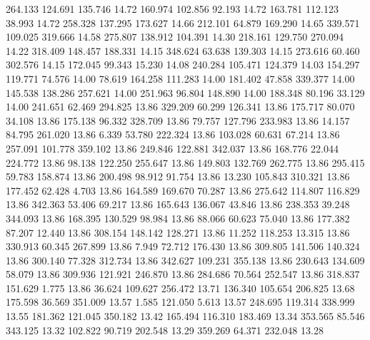  264.133  124.691  135.746        14.72
 160.974  102.856   92.193        14.72
 163.781  112.123   38.993        14.72
 258.328  137.295  173.627        14.66
 212.101   64.879  169.290        14.65
 339.571  109.025  319.666        14.58
 275.807  138.912  104.391        14.30
 218.161  129.750  270.094        14.22
 318.409  148.457  188.331        14.15
 348.624   63.638  139.303        14.15
 273.616   60.460  302.576        14.15
 172.045   99.343   15.230        14.08
 240.284  105.471  124.379        14.03
 154.297  119.771   74.576        14.00
  78.619  164.258  111.283        14.00
 181.402   47.858  339.377        14.00
 145.538  138.286  257.621        14.00
 251.963   96.804  148.890        14.00
 188.348   80.196   33.129        14.00
 241.651   62.469  294.825        13.86
 329.209   60.299  126.341        13.86
 175.717   80.070   34.108        13.86
 175.138   96.332  328.709        13.86
  79.757  127.796  233.983        13.86
  14.157   84.795  261.020        13.86
   6.339   53.780  222.324        13.86
 103.028   60.631   67.214        13.86
 257.091  101.778  359.102        13.86
 249.846  122.881  342.037        13.86
 168.776   22.044  224.772        13.86
  98.138  122.250  255.647        13.86
 149.803  132.769  262.775        13.86
 295.415   59.783  158.874        13.86
 200.498   98.912   91.754        13.86
  13.230  105.843  310.321        13.86
 177.452   62.428    4.703        13.86
 164.589  169.670   70.287        13.86
 275.642  114.807  116.829        13.86
 342.363   53.406   69.217        13.86
 165.643  136.067   43.846        13.86
 238.353   39.248  344.093        13.86
 168.395  130.529   98.984        13.86
  88.066   60.623   75.040        13.86
 177.382   87.207   12.440        13.86
 308.154  148.142  128.271        13.86
  11.252  118.253   13.315        13.86
 330.913   60.345  267.899        13.86
   7.949   72.712  176.430        13.86
 309.805  141.506  140.324        13.86
 300.140   77.328  312.734        13.86
 342.627  109.231  355.138        13.86
 230.643  134.609   58.079        13.86
 309.936  121.921  246.870        13.86
 284.686   70.564  252.547        13.86
 318.837  151.629    1.775        13.86
  36.624  109.627  256.472        13.71
 136.340  105.654  206.825        13.68
 175.598   36.569  351.009        13.57
   1.585  121.050    5.613        13.57
 248.695  119.314  338.999        13.55
 181.362  121.045  350.182        13.42
 165.494  116.310  183.469        13.34
 353.565   85.546  343.125        13.32
 102.822   90.719  202.548        13.29
 359.269   64.371  232.048        13.28

